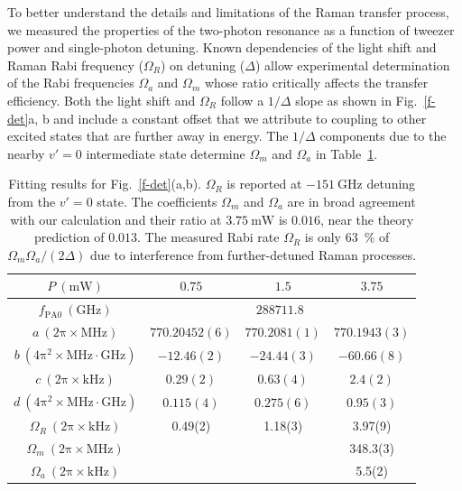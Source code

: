 \documentclass[aps,prl,twocolumn,10pt,superscriptaddress]{revtex4-1}
\begin{document}
To better understand the details and limitations of the Raman transfer process, we measured the properties of the two-photon resonance as a function of tweezer power and single-photon detuning.
Known dependencies of the light shift and Raman Rabi frequency ($\Omega_R$) on detuning ($\Delta$) allow experimental determination of the Rabi frequencies
$ \Omega_a $ and $\Omega_m$ whose ratio critically affects the transfer efficiency.
Both the light shift and $\Omega_R$ follow a $1/\Delta$ slope as shown in Fig.~\ref{f-det}a, b and include a constant offset that we attribute to coupling to other excited states that are further away in energy.
The $1/\Delta$ components due to the nearby $v'=0$ intermediate state determine $\Omega_m $ and $ \Omega_a $ in Table~\ref{tab:f-det:fit}.

\begin{table}[ht]
  \centering
  \begin{tabular}{|c|c|c|c|}
    $P~(\mathrm{mW})$&$0.75$&$1.5$&$3.75$\\\hline
    $f_{\mathrm{PA}0}~(\mathrm{GHz})$&\multicolumn{3}{|c|}{$288711.8$}\\\hline
    $a~(\mathrm{2\pi\times MHz})$&$770.20452(6)$&$770.2081(1)$&$770.1943(3)$\\
    $b~(\mathrm{4\pi^2\times MHz\cdot GHz})$&$-12.46(2)$&$-24.44(3)$&$-60.66(8)$\\\hline
    $c~(\mathrm{2\pi\times kHz})$&$0.29(2)$&$0.63(4)$&$2.4(2)$\\
    $d~(\mathrm{4\pi^2\times MHz\cdot GHz})$&$0.115(4)$&$0.275(6)$&$0.95(3)$\\ \hline
    $\Omega_R~(\mathrm{2\pi\times kHz})$ & 0.49(2) & 1.18(3) & 3.97(9) \\
    $\Omega_m~(\mathrm{2\pi\times MHz})$ & & & 348.3(3) \\
    $\Omega_a~(\mathrm{2\pi\times kHz})$ & & & 5.5(2)
  \end{tabular}
  \caption{Fitting results for Fig.~\ref{f-det}(a,b). $\Omega_R$ is reported at $-151~\mathrm{GHz}$ detuning from the $v' = 0$ state.  The coefficients $\Omega_m$ and $\Omega_a$ are in broad agreement with our calculation and their ratio at $3.75~\mathrm{mW}$ is $0.016$, near the theory prediction of $0.013$.  The measured Rabi rate $\Omega_R$ is only 63~\% of $\Omega_m \Omega_a/(2\Delta)$ due to interference from further-detuned Raman processes.
    \label{tab:f-det:fit}}
\end{table}
\end{document}
